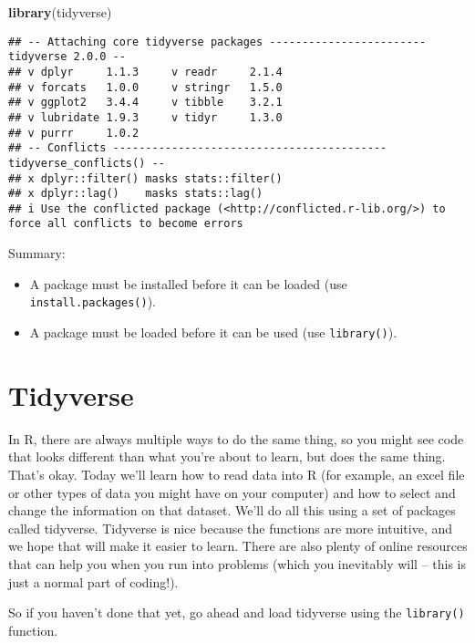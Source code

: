 \documentclass[
]{article}
\newenvironment{Shaded}{\begin{snugshade}}{\end{snugshade}}
\newcommand{\FunctionTok}[1]{\textcolor[rgb]{0.13,0.29,0.53}{\textbf{#1}}}
\newcommand{\NormalTok}[1]{#1}
\providecommand{\tightlist}{%
  \setlength{\itemsep}{0pt}\setlength{\parskip}{0pt}}
\begin{document}
\begin{Shaded}
\begin{Highlighting}[]
\FunctionTok{library}\NormalTok{(tidyverse)}
\end{Highlighting}
\end{Shaded}

\begin{verbatim}
## -- Attaching core tidyverse packages ------------------------ tidyverse 2.0.0 --
## v dplyr     1.1.3     v readr     2.1.4
## v forcats   1.0.0     v stringr   1.5.0
## v ggplot2   3.4.4     v tibble    3.2.1
## v lubridate 1.9.3     v tidyr     1.3.0
## v purrr     1.0.2     
## -- Conflicts ------------------------------------------ tidyverse_conflicts() --
## x dplyr::filter() masks stats::filter()
## x dplyr::lag()    masks stats::lag()
## i Use the conflicted package (<http://conflicted.r-lib.org/>) to force all conflicts to become errors
\end{verbatim}

Summary:

\begin{itemize}
\tightlist
\item
  A package must be installed before it can be loaded (use
  \texttt{install.packages()}).
\item
  A package must be loaded before it can be used (use
  \texttt{library()}).
\end{itemize}

\hypertarget{tidyverse}{%
\section{Tidyverse}\label{tidyverse}}

In R, there are always multiple ways to do the same thing, so you might
see code that looks different than what you're about to learn, but does
the same thing. That's okay. Today we'll learn how to read data into R
(for example, an excel file or other types of data you might have on
your computer) and how to select and change the information on that
dataset. We'll do all this using a set of packages called tidyverse.
Tidyverse is nice because the functions are more intuitive, and we hope
that will make it easier to learn. There are also plenty of online
resources that can help you when you run into problems (which you
inevitably will -- this is just a normal part of coding!).

So if you haven't done that yet, go ahead and load tidyverse using the
\texttt{library()} function.
\end{document}

